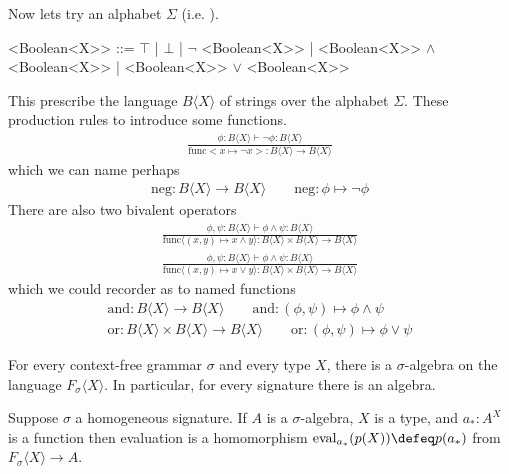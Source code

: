 \begin{example}
    Now lets try an alphabet $\Sigma$ (i.e. ).
\begin{center}
\begin{Gcode}[]
<Boolean<X>> ::= $\top$
                | $\bot$
                | $\neg$ <Boolean<X>>
                | <Boolean<X>> $\wedge$ <Boolean<X>>
                | <Boolean<X>> $\vee$ <Boolean<X>>
\end{Gcode}
\end{center}
This prescribe the language $B\langle X\rangle$ of strings over the alphabet $\Sigma$.
    These production rules to introduce some functions.
    \begin{gather*}
        \frac{
            \phi:B\langle X\rangle \vdash \neg\phi:B\langle X\rangle
        }{
            \text{func}<x\mapsto \neg x>:B\langle X\rangle \to B\langle X\rangle
        }
    \end{gather*}
    which we can name perhaps
    \begin{gather*}
        \text{neg}:B\langle X\rangle \to B\langle X\rangle
        \qquad \text{neg}:\phi \mapsto \neg \phi
    \end{gather*}
    There are also two bivalent operators
    \begin{gather*}
        \frac{
            \phi,\psi:B\langle X\rangle \vdash \phi\wedge \psi:B\langle X\rangle
        }{
            \text{func}\langle (x,y)\mapsto x\wedge y\rangle:
             B\langle X\rangle\times B\langle X\rangle \to B\langle X\rangle
        }\\
        \frac{
            \phi,\psi:B\langle X\rangle \vdash \phi\wedge \psi:B\langle X\rangle
        }{
            \text{func}\langle (x,y)\mapsto x\vee y\rangle:
            B\langle X\rangle\times B\langle X\rangle \to B\langle X\rangle
        }
    \end{gather*}
    which we could recorder as to named functions
    \begin{gather*}
        \text{and}:B\langle X\rangle \to B\langle X\rangle
        \qquad \text{and}:(\phi,\psi) \mapsto \phi\wedge \psi\\
        \text{or}:B\langle X\rangle\times B\langle X\rangle \to B\langle X\rangle
        \qquad \text{or}:(\phi,\psi) \mapsto \phi\vee\psi
    \end{gather*}

\end{example}



\begin{theorem}
    For every context-free grammar $\sigma$ and every type $X$, 
    there is a $\sigma$-algebra on the language $F_{\sigma}\langle X\rangle$.
    In particular, for every signature there is an algebra.
\end{theorem}

\begin{theorem}
    Suppose $\sigma$ a homogeneous signature.
    If $A$ is a $\sigma$-algebra, $X$ is a type, and $a_*:A^X$ is a function 
    then evaluation is a homomorphism $\text{eval}_{a_*}(p(X))\defeq p(a_*)$ 
    from $F_{\sigma}\langle X\rangle\to A$.
\end{theorem}
